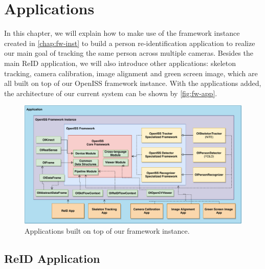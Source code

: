 \chapter{Applications}
\label{chap:fw-app}

In this chapter, we will explain how to make use of the framework
instance created in \autoref{chap:fw-inst} to build a person
re-identification application to realize our main goal of tracking the same person 
across multiple cameras. Besides the main ReID application, we will also 
introduce other applications: skeleton tracking, camera calibration, image 
alignment and green screen image, which are all built on top of our OpenISS 
framework instance.
With the applications added, the architecture of our current system can be 
shown by \autoref{fig:fw-app}.

\begin{figure}
    \centering
    \includegraphics[width=\linewidth]{figures/framework_app.pdf}
    \caption{Applications built on top of our framework instance.}
    \label{fig:fw-app}
\end{figure}

\section{ReID Application}
\label{sec:fw-app-reid}


